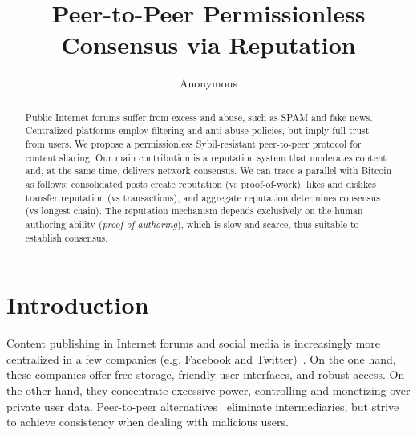 \documentclass[12pt]{article}
\title{
    Peer-to-Peer Permissionless Consensus via Reputation
}
\author{Anonymous}
\begin{document}
\maketitle

\begin{abstract}
Public Internet forums suffer from excess and abuse, such as SPAM and fake
news.
Centralized platforms employ filtering and anti-abuse policies, but imply full
trust from users.
%
We propose a permissionless Sybil-resistant peer-to-peer protocol for content
sharing.
Our main contribution is a reputation system that moderates content and, at the
same time, delivers network consensus.
We can trace a parallel with Bitcoin as follows:
    consolidated posts create reputation (vs proof-of-work),
    likes and dislikes transfer reputation (vs transactions), and
    aggregate reputation determines consensus (vs longest chain).
%
The reputation mechanism depends exclusively on the human authoring ability
(\emph{proof-of-authoring}), which is slow and scarce, thus suitable to
establish consensus.
\end{abstract}

\section{Introduction}
\label{sec.introduction}

Content publishing in Internet forums and social media is
increasingly more centralized in a few companies (e.g. Facebook and
Twitter)~\cite{internet.fixing}.
On the one hand, these companies offer free storage, friendly user interfaces,
and robust access.
On the other hand, they concentrate excessive power, controlling and monetizing
over private user data.
%
Peer-to-peer alternatives~\cite{p2p.survey} eliminate intermediaries, but
strive to achieve consistency when dealing with malicious users.
\end{document}
